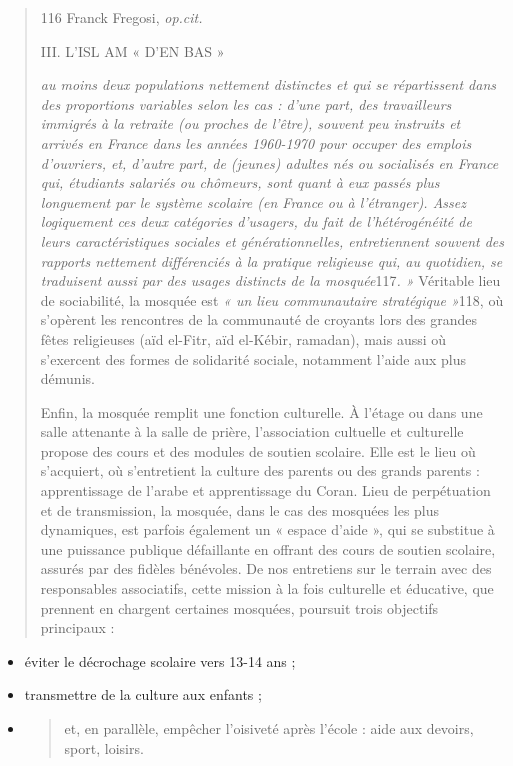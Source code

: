 \begin{quote}
116 Franck Fregosi, \emph{op.cit.}

III. L'ISL AM « D'EN BAS »

\emph{au moins deux populations nettement distinctes et qui se
répartissent dans des proportions variables selon les cas : d'une part,
des travailleurs immigrés à la retraite (ou proches de l'être), souvent
peu instruits et arrivés en France dans les années 1960-1970 pour
occuper des emplois d'ouvriers, et, d'autre part, de (jeunes) adultes
nés ou socialisés en France qui, étudiants salariés ou chômeurs, sont
quant à eux passés plus longuement par le système scolaire (en France ou
à l'étranger). Assez logiquement ces deux catégories d'usagers, du fait
de l'hétérogénéité de leurs caractéristiques sociales et
générationnelles, entretiennent souvent des rapports nettement
différenciés à la pratique religieuse qui, au quotidien, se traduisent
aussi par des usages distincts de la mosquée}117\emph{. »} Véritable
lieu de sociabilité, la mosquée est \emph{« un lieu communautaire
stratégique »}118, où s'opèrent les rencontres de la communauté de
croyants lors des grandes fêtes religieuses (aïd el-Fitr, aïd el-Kébir,
ramadan), mais aussi où s'exercent des formes de solidarité sociale,
notamment l'aide aux plus démunis.

Enfin, la mosquée remplit une fonction culturelle. À l'étage ou dans une
salle attenante à la salle de prière, l'association cultuelle et
culturelle propose des cours et des modules de soutien scolaire. Elle
est le lieu où s'acquiert, où s'entretient la culture des parents ou des
grands parents : apprentissage de l'arabe et apprentissage du Coran.
Lieu de perpétuation et de transmission, la mosquée, dans le cas des
mosquées les plus dynamiques, est parfois également un « espace d'aide
», qui se substitue à une puissance publique défaillante en offrant des
cours de soutien scolaire, assurés par des fidèles bénévoles. De nos
entretiens sur le terrain avec des responsables associatifs, cette
mission à la fois culturelle et éducative, que prennent en chargent
certaines mosquées, poursuit trois objectifs principaux :
\end{quote}

\begin{itemize}
\item
  éviter le décrochage scolaire vers 13-14 ans ;
\item
  transmettre de la culture aux enfants ;
\item
  \begin{quote}
  et, en parallèle, empêcher l'oisiveté après l'école : aide aux
  devoirs, sport, loisirs.
  \end{quote}
\end{itemize}

